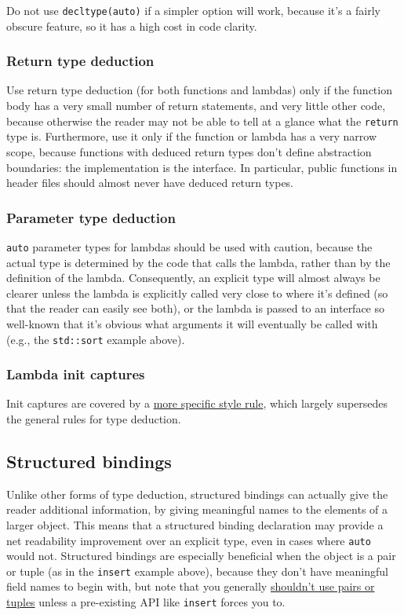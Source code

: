 Do not use \texttt{decltype(auto)} if a simpler option will work, because it's a fairly obscure feature, so it has a high cost in code clarity.
\subsubsection{Return type deduction}
Use return type deduction (for both functions and lambdas) only if the function body has a very small number of return statements, and very little other code, because otherwise the reader may not be able to tell at a glance what the \texttt{return} type is. Furthermore, use it only if the function or lambda has a very narrow scope, because functions with deduced return types don't define abstraction boundaries: the implementation is the interface. In particular, public functions in header files should almost never have deduced return types.

\subsubsection{Parameter type deduction}
\texttt{auto} parameter types for lambdas should be used with caution, because the actual type is determined by the code that calls the lambda, rather than by the definition of the lambda. Consequently, an explicit type will almost always be clearer unless the lambda is explicitly called very close to where it's defined (so that the reader can easily see both), or the lambda is passed to an interface so well-known that it's obvious what arguments it will eventually be called with (e.g., the \texttt{std::sort} example above).
\subsubsection{Lambda init captures}
Init captures are covered by a \hyperref[ch07:sec:lambda-expressions]{more specific style rule}, which largely supersedes the general rules for type deduction.

\subsection{Structured bindings}
Unlike other forms of type deduction, structured bindings can actually give the reader additional information, by giving meaningful names to the elements of a larger object. This means that a structured binding declaration may provide a net readability improvement over an explicit type, even in cases where \texttt{auto} would not. Structured bindings are especially beneficial when the object is a pair or tuple (as in the \texttt{insert} example above), because they don't have meaningful field names to begin with, but note that you generally \hyperref[sec:structs-vs.-pairs-and-tuples]{shouldn't use pairs or tuples} unless a pre-existing API like \texttt{insert} forces you to.

